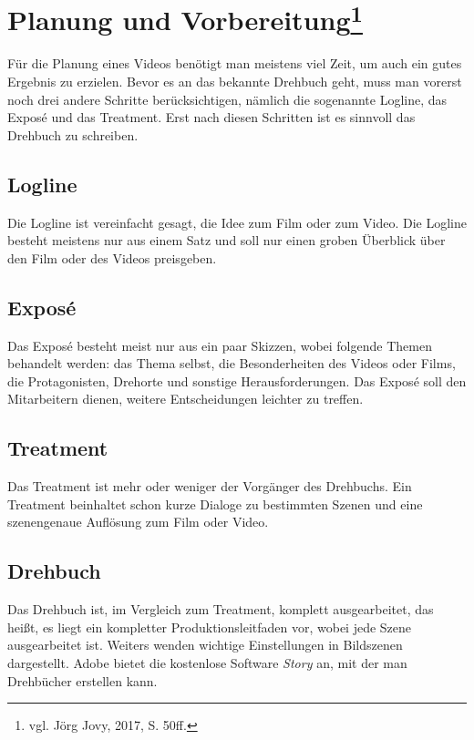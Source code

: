 \section[Planung und Vorbereitung]{Planung und Vorbereitung\protect\footnote{\label{}vgl. Jörg Jovy, 2017, S. 50ff.}}
Für die Planung eines Videos benötigt man meistens viel Zeit, um auch ein gutes Ergebnis zu erzielen. Bevor es an das bekannte Drehbuch geht, muss man vorerst noch drei andere Schritte berücksichtigen, nämlich die sogenannte Logline, das Expos\'{e} und das Treatment. Erst nach diesen Schritten ist es sinnvoll das Drehbuch zu schreiben. 
\subsection{Logline}
Die Logline ist vereinfacht gesagt, die Idee zum Film oder zum Video. Die Logline besteht meistens nur aus einem Satz und soll nur einen groben Überblick über den Film oder des Videos preisgeben. 
\subsection{Expos\'{e}}
Das Expos\'{e} besteht meist nur aus ein paar Skizzen, wobei folgende Themen behandelt werden: das Thema selbst, die Besonderheiten des Videos oder Films, die Protagonisten, Drehorte und sonstige Herausforderungen. Das Expos\'{e} soll den Mitarbeitern dienen, weitere Entscheidungen leichter zu treffen.
\subsection{Treatment}
Das Treatment ist mehr oder weniger der Vorgänger des Drehbuchs. Ein Treatment beinhaltet schon kurze Dialoge zu bestimmten Szenen und eine szenengenaue Auflösung zum Film oder Video.
\subsection{Drehbuch}
Das Drehbuch ist, im Vergleich zum Treatment, komplett ausgearbeitet, das heißt, es liegt ein kompletter Produktionsleitfaden vor, wobei jede Szene ausgearbeitet ist. Weiters wenden wichtige Einstellungen in Bildszenen dargestellt. Adobe bietet die kostenlose Software \textit{Story} an, mit der man Drehbücher erstellen kann. 
